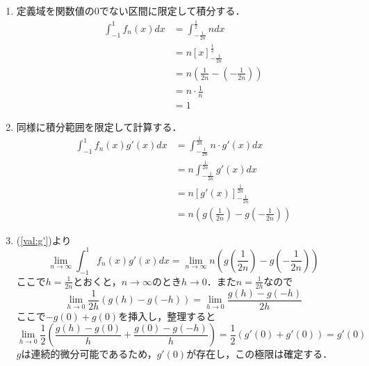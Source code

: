 \documentclass[dvipdfmx]{jsreport}
\begin{document}
\begin{souanswer}
\begin{enumerate}
	\item 定義域を関数値の0でない区間に限定して積分する．
\begin{align*}
	\int_{-1}^1 f_n(x) dx
	&= \int_{-\frac{1}{2n}}^{\frac{1}{2}} n dx\\
	&= n[x]_{-\frac{1}{2n}}^{\frac{1}{2}}\\
	&= n\left(\frac{1}{2n}- \left(-\frac{1}{2n}\right)\right)\\
	&= n\cdot \frac{1}{n}\\
	&= 1
\end{align*}
	\item\label{val:g'} 同様に積分範囲を限定して計算する．
\begin{align*}
	\int_{-1}^1 f_n(x)g'(x) dx
	&= \int_{-\frac{1}{2n}}^\frac{1}{2n} n\cdot g'(x) dx\\
	&= n\int_{-\frac{1}{2n}}^\frac{1}{2n} g'(x) dx\\
	&= n[g'(x)]_{-\frac{1}{2n}}^\frac{1}{2n}\\
	&= n\left(g\left(\frac{1}{2n}\right)- g\left(-\frac{1}{2n}\right)\right)
\end{align*}
	\item (\ref{val:g'})より
\begin{equation*}
	\lim_{n\to \infty}\int_{-1}^1 f_n(x)g'(x) dx= \lim_{n\to \infty} n\left(g\left(\frac{1}{2n}\right)- g\left(-\frac{1}{2n}\right)\right)
\end{equation*}
	ここで$h= \frac{1}{2n}$とおくと，$n\to \infty$のとき$h\to 0$．また$n= \frac{1}{2h}$なので
\begin{equation*}
	\lim_{h\to 0} \frac{1}{2h}(g(h)- g(-h))= \lim_{h\to 0}\frac{g(h)- g(-h)}{2h}
\end{equation*}
	ここで$-g(0)+ g(0)$を挿入し，整理すると
\begin{equation*}
	\lim_{h\to 0} \frac{1}{2}\left(\frac{g(h)- g(0)}{h}+ \frac{g(0)- g(-h)}{h}\right)= \frac{1}{2}(g'(0)+ g'(0))= g'(0)
\end{equation*}
	$g$は連続的微分可能であるため，$g'(0)$が存在し，この極限は確定する．
\end{enumerate}
\end{souanswer}
\end{document}
